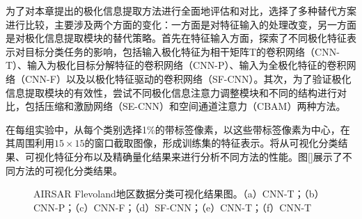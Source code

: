\begin{table}[h]
    \caption{Felvoand地区实验数据集有标签样本数量}
    \label{flevoland_smaple}
\end{table}


为了对本章提出的极化信息提取方法进行全面地评估和对比，选择了多种替代方案进行比较，主要涉及两个方面的变化：一方面是对特征输入的处理改变，另一方面是对极化信息提取模块的替代策略。首先在特征输入方面，探索了不同极化特征表示对目标分类任务的影响，包括输入极化特征为相干矩阵T的卷积网络（CNN-T）、输入为极化目标分解特征的卷积网络（CNN-P）、输入为全极化特征的卷积网络（CNN-F）以及以极化特征驱动的卷积网络（SF-CNN）\citing{}。其次，为了验证极化信息提取模块的有效性，尝试不同极化信息注意力调整模块和不同的结构进行对比，包括压缩和激励网络（SE-CNN）和空间通道注意力（CBAM）两种方法。

在每组实验中，从每个类别选择1\%的带标签像素，以这些带标签像素为中心，在其周围利用$15 \times 15$的窗口截取图像，形成训练集的特征表示。将从可视化分类结果、可视化特征分布以及精确量化结果来进行分析不同方法的性能。图\ref{}展示了不同方法的可视化分类结果。

\begin{figure}[ht]
    \quad
    \caption{AIRSAR Flevoland地区数据分类可视化结果图。（a）CNN-T；（b）CNN-P；（c）CNN-F；（d）SF-CNN；（e）CNN-T；（f）CNN-T}
    \label{fig2}
\end{figure}

